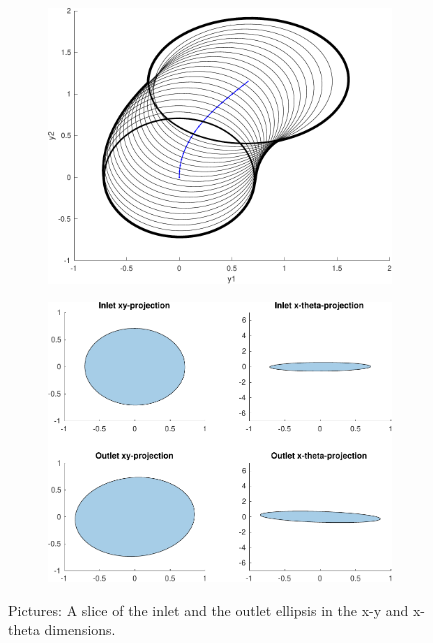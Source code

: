 \begin{figure}
  \centering
  \begin{subfigure}[b]{0.5\textwidth}
    \includegraphics[width=\textwidth]{figures/experiments/sos-calculation}
  \end{subfigure}
  \quad
  \begin{subfigure}[b]{0.5\textwidth}
    \includegraphics[width=\textwidth]{figures/experiments/sos-calculation-inlet-outlet}
  \end{subfigure}
  \caption{Pictures: A slice of the inlet and the outlet ellipsis in the x-y and
    x-theta dimensions.}
  \label{fig:funnel-conv}
\end{figure}

